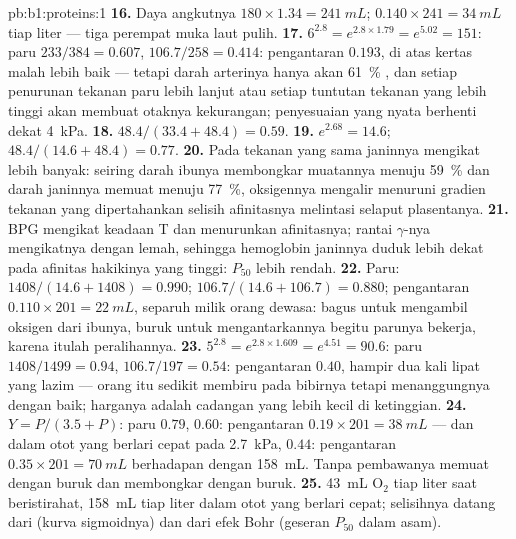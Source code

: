 \begin{solution}{pb:b1:proteins:1}
\textbf{16.} Daya angkutnya $180\times 1.34 = \qty{241}{mL}$;
$0.140\times
241 = \qty{34}{mL}$ tiap liter --- tiga perempat muka laut pulih.
\textbf{17.} $6^{2.8} = e^{2.8\times 1.79} = e^{5.02} = 151$: paru
$233/384 = 0.607$,  $106.7/258 = 0.414$: pengantaran $0.193$,
di atas kertas malah lebih baik --- tetapi darah arterinya hanya akan
\qty{61}{\%} , dan setiap penurunan tekanan paru lebih lanjut atau
setiap tuntutan tekanan  yang lebih tinggi akan membuat otaknya
kekurangan; penyesuaian yang nyata berhenti dekat \qty{4}{kPa}.
\textbf{18.} $48.4/(33.4 + 48.4) = 0.59$.
\textbf{19.} $e^{2.68} = 14.6$; $48.4/(14.6 + 48.4) = 0.77$.
\textbf{20.} Pada tekanan yang sama  janinnya mengikat lebih
banyak: seiring darah ibunya membongkar muatannya menuju \qty{59}{\%}
dan darah janinnya memuat menuju \qty{77}{\%}, oksigennya mengalir
menuruni gradien tekanan yang dipertahankan selisih afinitasnya
melintasi selaput plasentanya.
\textbf{21.} BPG mengikat keadaan T dan menurunkan afinitasnya; rantai
$\gamma$-nya mengikatnya dengan lemah, sehingga hemoglobin janinnya
duduk lebih dekat pada afinitas hakikinya yang tinggi: $P_{50}$ lebih
rendah.
\textbf{22.} Paru: $1408/(14.6 + 1408) = 0.990$;  $106.7/(14.6
+ 106.7) = 0.880$; pengantaran $0.110\times 201 = \qty{22}{mL}$,
separuh milik orang dewasa: bagus untuk mengambil oksigen dari ibunya,
buruk untuk mengantarkannya begitu parunya bekerja, karena itulah
peralihannya.
\textbf{23.} $5^{2.8} = e^{2.8\times 1.609} = e^{4.51} = 90.6$: paru
$1408/1499 = 0.94$,  $106.7/197 = 0.54$: pengantaran $0.40$,
hampir dua kali lipat yang lazim --- orang itu sedikit membiru pada
bibirnya tetapi menanggungnya dengan baik; harganya adalah cadangan
yang lebih kecil di ketinggian.
\textbf{24.} $Y = P/(3.5 + P)$: paru $0.79$,  $0.60$:
pengantaran $0.19\times 201 = \qty{38}{mL}$ --- dan dalam otot yang
berlari cepat pada \qty{2.7}{kPa}, $0.44$:
pengantaran $0.35\times 201 = \qty{70}{mL}$ berhadapan dengan
\qty{158}{mL}. Tanpa 
pembawanya memuat dengan buruk dan membongkar dengan buruk.
\textbf{25.} \qty{43}{mL} $\mathrm{O_2}$ tiap liter saat beristirahat,
\qty{158}{mL} tiap liter dalam otot yang berlari cepat; selisihnya
datang dari  (kurva sigmoidnya) dan dari efek Bohr (geseran
$P_{50}$ dalam asam).
\end{solution}
